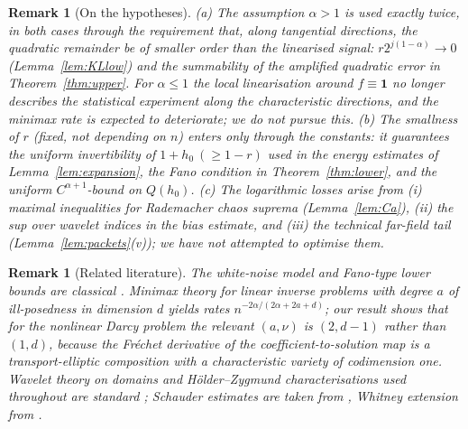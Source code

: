 \documentclass[11pt]{amsart}
\newtheorem{remark}[theorem]{Remark}
\newcommand{\1}{\mathbf{1}}
\begin{document}
\begin{remark}[On the hypotheses]
\emph{(a)} The assumption $\alpha>1$ is used exactly twice, in both cases
through the requirement that, along tangential directions, the quadratic
remainder be of smaller order than the linearised signal:
$r2^{j(1-\alpha)}\to0$ (Lemma~\ref{lem:KLlow}) and the summability of the
amplified quadratic error in Theorem~\ref{thm:upper}. For $\alpha\le1$ the
local linearisation around $f\equiv\1$ no longer describes the statistical
experiment along the characteristic directions, and the minimax rate is
expected to deteriorate; we do not pursue this.
\emph{(b)} The smallness of $r$ (fixed, not depending on $n$) enters only
through the constants: it guarantees the uniform invertibility of
$1+h_0\ (\ge1-r)$ used in the energy estimates of
Lemma~\ref{lem:expansion}, the Fano condition in
Theorem~\ref{thm:lower}, and the uniform $C^{\alpha+1}$-bound on $Q(h_0)$.
\emph{(c)} The logarithmic losses arise from (i) maximal inequalities for
Rademacher chaos suprema (Lemma~\ref{lem:Ca}), (ii) the sup over wavelet
indices in the bias estimate, and (iii) the technical far-field tail
(Lemma~\ref{lem:packets}(v)); we have not attempted to optimise them.
\end{remark}

\begin{remark}[Related literature]
The white-noise model and Fano-type lower bounds are classical
\cite{IbK81,Tsy09}. Minimax theory for linear inverse problems with degree
$a$ of ill-posedness in dimension $d$ yields rates
$n^{-2\alpha/(2\alpha+2a+d)}$; our result shows that for the nonlinear
Darcy problem the relevant $(a,\nu)$ is $(2,d-1)$ rather than $(1,d)$,
because the Fr\'echet derivative of the coefficient-to-solution map is a
transport-elliptic composition with a characteristic variety of
codimension one. Wavelet theory on domains and H\"older--Zygmund
characterisations used throughout are standard \cite{Tri08,Tri92}; Schauder
estimates are taken from \cite{GT01}, Whitney extension from \cite{Ste70}.
\end{remark}
\end{document}
